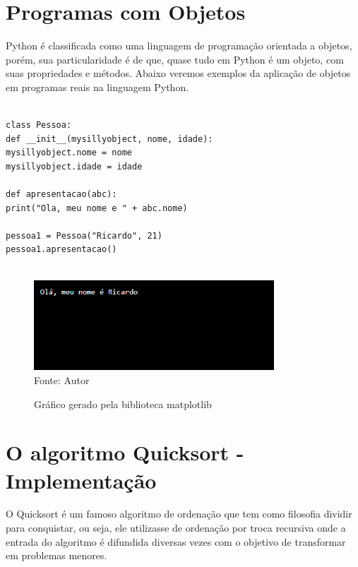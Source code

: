     \section{Programas com Objetos}
Python é classificada como uma linguagem de programação orientada a objetos, porém, sua particularidade é de que, quase tudo em Python é um objeto, com suas propriedades e métodos. Abaixo veremos exemplos da aplicação de objetos em programas reais na linguagem Python.
\begin{lstlisting}

class Pessoa:
def __init__(mysillyobject, nome, idade):
mysillyobject.nome = nome
mysillyobject.idade = idade

def apresentacao(abc):
print("Ola, meu nome e " + abc.nome)

pessoa1 = Pessoa("Ricardo", 21)
pessoa1.apresentacao()
	
\end{lstlisting}

 \begin{figure}[H]
	\begin{center}
		\caption{Gráfico gerado pela biblioteca matplotlib} \label{ling1}
		\includegraphics[width=9cm]{expobj.PNG} \\
		{\tiny \sf Fonte:{ Autor}}
	\end{center}
\end{figure}

    \section{O algoritmo Quicksort - Implementa\c{c}\~{a}o}

O Quicksort é um famoso algoritmo de ordenação que tem como filosofia dividir para conquistar, ou seja, ele utilizasse de ordenação por troca recursiva onde a entrada do algoritmo é difundida diversas vezes com o objetivo de transformar em problemas menores.

